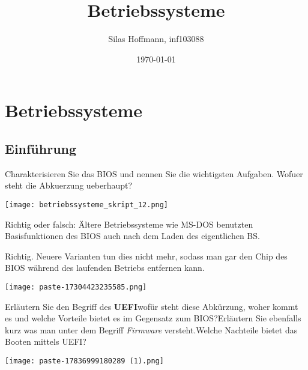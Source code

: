 \documentclass{article}
\title{Betriebssysteme}
\author{Silas Hoffmann, inf103088}
\date{\today}
\begin{document}
\maketitle
\vspace{0.5cm}
\tableofcontents
\clearpage

\section{Betriebssysteme}
\subsection{Einführung}
\begin{tcolorbox}[colback=white!10!white,colframe=lightgray!75!black,
  savelowerto=\jobname_ex.tex,breakable,enhanced,lines before break=40]

\justifying
Charakterisieren Sie das BIOS und nennen Sie die wichtigsten Aufgaben. Wofuer steht die Abkuerzung ueberhaupt?

\tcblower

\justifying
\begin{center}
\texttt{[image: betriebssysteme\_skript\_12.png]}
\end{center}

\end{tcolorbox}
\begin{tcolorbox}[colback=white!10!white,colframe=lightgray!75!black,
  savelowerto=\jobname_ex.tex,breakable,enhanced,lines before break=40]

\justifying
Richtig oder falsch: Ältere Betriebssysteme wie MS-DOS benutzten Basisfunktionen des BIOS auch nach dem Laden des eigentlichen BS.

\tcblower

\justifying
Richtig. Neuere Varianten tun dies nicht mehr, sodass man gar den Chip des BIOS während des laufenden Betriebs entfernen kann.\begin{center}
\texttt{[image: paste-17304423235585.png]}
\end{center}

\end{tcolorbox}
\begin{tcolorbox}[colback=white!10!white,colframe=lightgray!75!black,
  savelowerto=\jobname_ex.tex,breakable,enhanced,lines before break=40]

\justifying
Erläutern Sie den Begriff des \textbf{UEFI}wofür steht diese Abkürzung, woher kommt es und welche Vorteile bietet es im Gegensatz zum BIOS?Erläutern Sie ebenfalls kurz was man unter dem Begriff \textit{Firmware }versteht.Welche Nachteile bietet das Booten mittels UEFI?

\tcblower

\justifying
\begin{center}
\texttt{[image: paste-17836999180289 (1).png]}
\end{center}

\end{tcolorbox}
\end{document}
